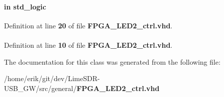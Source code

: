 \paragraph[{reset\+\_\+n}]{ {\bfseries \textcolor{keywordflow}{in}\textcolor{vhdlchar}{ }} {\bfseries \textcolor{comment}{std\+\_\+logic}\textcolor{vhdlchar}{ }} \hspace{0.3cm}{\ttfamily [Port]}}\label{classFPGA__LED2__ctrl_a446ea52ed8c4a84181a47d9165ce41a5}


Definition at line {\bf 20} of file {\bf F\+P\+G\+A\+\_\+\+L\+E\+D2\+\_\+ctrl.\+vhd}.

\paragraph[{std\+\_\+logic\+\_\+1164}]{\hspace{0.3cm}{\ttfamily [Package]}}\label{classFPGA__LED2__ctrl_acd03516902501cd1c7296a98e22c6fcb}


Definition at line {\bf 10} of file {\bf F\+P\+G\+A\+\_\+\+L\+E\+D2\+\_\+ctrl.\+vhd}.



The documentation for this class was generated from the following file\+:\begin{DoxyCompactItemize}
\item 
/home/erik/git/dev/\+Lime\+S\+D\+R-\/\+U\+S\+B\+\_\+\+G\+W/src/general/{\bf F\+P\+G\+A\+\_\+\+L\+E\+D2\+\_\+ctrl.\+vhd}\end{DoxyCompactItemize}
